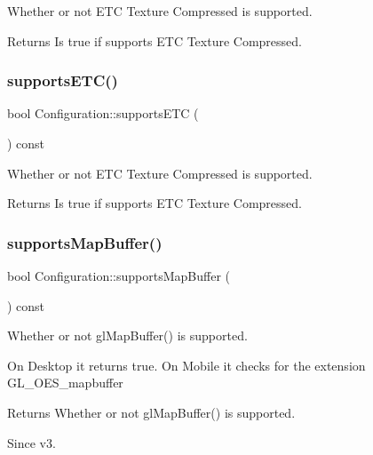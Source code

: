 Whether or not E\+TC Texture Compressed is supported.

\begin{DoxyReturn}{Returns}
Is true if supports E\+TC Texture Compressed. 
\end{DoxyReturn}
\mbox{\label{classConfiguration_aeb2edb07e4e99adcc5cac8eb40dd5bd1}} 
\subsubsection{\texorpdfstring{supports\+E\+T\+C()}{supportsETC()}\hspace{0.1cm}{\footnotesize\ttfamily [2/2]}}
{\footnotesize\ttfamily bool Configuration\+::supports\+E\+TC (\begin{DoxyParamCaption}{ }\end{DoxyParamCaption}) const}

Whether or not E\+TC Texture Compressed is supported.

\begin{DoxyReturn}{Returns}
Is true if supports E\+TC Texture Compressed. 
\end{DoxyReturn}
\mbox{\label{classConfiguration_a765fca7763cf48f4ebc8947e2800aa10}} 
\subsubsection{\texorpdfstring{supports\+Map\+Buffer()}{supportsMapBuffer()}\hspace{0.1cm}{\footnotesize\ttfamily [1/2]}}
{\footnotesize\ttfamily bool Configuration\+::supports\+Map\+Buffer (\begin{DoxyParamCaption}{ }\end{DoxyParamCaption}) const}

Whether or not gl\+Map\+Buffer() is supported.

On Desktop it returns {\ttfamily true}. On Mobile it checks for the extension {\ttfamily G\+L\+\_\+\+O\+E\+S\+\_\+mapbuffer}

\begin{DoxyReturn}{Returns}
Whether or not {\ttfamily gl\+Map\+Buffer()} is supported. 
\end{DoxyReturn}
\begin{DoxySince}{Since}
v3. 
\end{DoxySince}
\mbox{\label{classConfiguration_a765fca7763cf48f4ebc8947e2800aa10}} 
